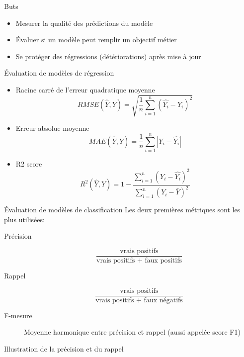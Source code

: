 \begin{frame}{Buts}
  \begin{itemize}[<+->]
    \item Mesurer la qualité des prédictions du modèle
    \item Évaluer si un modèle peut remplir un objectif métier
    \item Se protéger des régressions (détériorations) après mise à jour
  \end{itemize}
\end{frame}

\begin{frame}{Évaluation de modèles de régression}
  \begin{itemize}
    \item Racine carré de l'erreur quadratique moyenne $$RMSE(\hat{Y}, Y) = \sqrt{\frac{1}{n} \sum_{i=1}^n (\hat{Y_i} - Y_i)^2}$$
    \item Erreur absolue moyenne $$MAE(\hat{Y}, Y) = \frac{1}{n} \sum_{i=1}^n |Y_i - \hat{Y_i}|$$
    \item R2 score $$R^2(\hat{Y}, Y) = 1 - \frac{\sum_{i=1}^n (Y_i - \hat{Y_i})^2}{\sum_{i=1}^n (Y_i - \bar{Y})^2}$$
  \end{itemize}
\end{frame}

\begin{frame}{Évaluation de modèles de classification}
  Les deux premières métriques sont les plus utilisées:
  \begin{description}
  \item[Précision]
    \[
    \frac{\text{vrais positifs}}{\text{vrais positifs + faux positifs}}
    \]
  \item[Rappel]
    \[
    \frac{\text{vrais positifs}}{\text{vrais positifs + faux négatifs}}
  \]
  \item[F-mesure] Moyenne harmonique entre précision et rappel (aussi appelée score F1)
  \end{description}
\end{frame}

\begin{frame}{Illustration de la précision et du rappel}
\end{frame}

